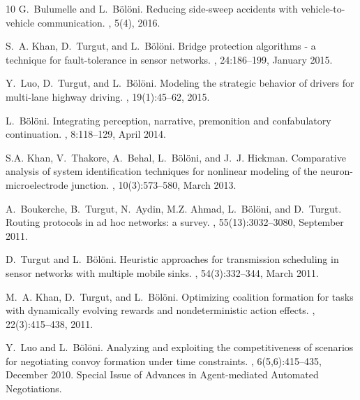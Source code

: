 \begin{thebibliography}{10}
G.~Bulumelle and L.~Bölöni.
\newblock Reducing side-sweep accidents with vehicle-to-vehicle communication.
, 5(4), 2016.

S.~A. Khan, D.~Turgut, and L.~Bölöni.
\newblock Bridge protection algorithms - a technique for fault-tolerance in
  sensor networks.
, 24:186--199, January 2015.

Y.~Luo, D.~Turgut, and L.~Bölöni.
\newblock Modeling the strategic behavior of drivers for multi-lane highway
  driving.
, 19(1):45--62,
  2015.

L.~Bölöni.
\newblock Integrating perception, narrative, premonition and confabulatory
  continuation.
, 8:118--129,
  April 2014.

S.A. Khan, V.~Thakore, A.~Behal, L.~Bölöni, and J.~J. Hickman.
\newblock Comparative analysis of system identification techniques for
  nonlinear modeling of the neuron-microelectrode junction.
,
  10(3):573--580, March 2013.

A.~Boukerche, B.~Turgut, N.~Aydin, M.Z. Ahmad, L.~Bölöni, and D.~Turgut.
\newblock Routing protocols in ad hoc networks: a survey.
, 55(13):3032--3080, September 2011.

D.~Turgut and L.~Bölöni.
\newblock Heuristic approaches for transmission scheduling in sensor networks
  with multiple mobile sinks.
, 54(3):332--344, March 2011.

M.~A. Khan, D.~Turgut, and L.~Bölöni.
\newblock Optimizing coalition formation for tasks with dynamically evolving
  rewards and nondeterministic action effects.
,
  22(3):415--438, 2011.

Y.~Luo and L.~Bölöni.
\newblock Analyzing and exploiting the competitiveness of scenarios for
  negotiating convoy formation under time constraints.
,
  6(5,6):415--435, December 2010.
\newblock Special Issue of Advances in Agent-mediated Automated Negotiations.


\end{thebibliography}
